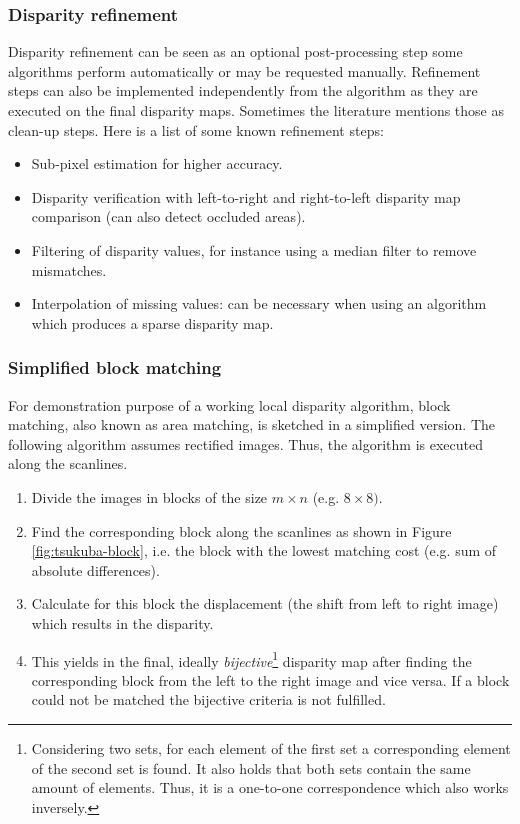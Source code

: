 \subsubsection{Disparity refinement}

Disparity refinement can be seen as an optional post-processing step some algorithms perform automatically or may be requested manually.
Refinement steps can also be implemented independently from the algorithm as they are executed on the final disparity maps.
Sometimes the literature mentions those as clean-up steps.
Here is a list of some known refinement steps:

\begin{itemize}
  \item Sub-pixel estimation for higher accuracy.
  \item Disparity verification with left-to-right and right-to-left disparity map comparison (can also detect occluded areas).
  \item Filtering of disparity values, for instance using a median filter to remove mismatches.
  \item Interpolation of missing values: can be necessary when using an algorithm which produces a sparse disparity map.
\end{itemize}

\subsubsection{Simplified block matching}

\noindent For demonstration purpose of a working local disparity algorithm, block matching, also known as area matching, is sketched in a simplified version.
The following algorithm assumes rectified images.
Thus, the algorithm is executed along the scanlines.

\begin{enumerate}
  \item Divide the images in blocks of the size $m \times n$ (e.g. $8 \times 8)$.
  \item Find the corresponding block along the scanlines as shown in Figure \ref{fig:tsukuba-block}, i.e. the block with the lowest matching cost (e.g. sum of absolute differences).
  \item Calculate for this block the displacement (the shift from left to right image) which results in the disparity.
  \item This yields in the final, ideally \textit{bijective}\footnote{Considering two sets, for each element of the first set a corresponding element of the second set is found. It also holds that both sets contain the same amount of elements. Thus, it is a one-to-one correspondence which also works inversely.} disparity map after finding the corresponding block from the left to the right image and vice versa. If a block could not be matched the bijective criteria is not fulfilled.
\end{enumerate}

